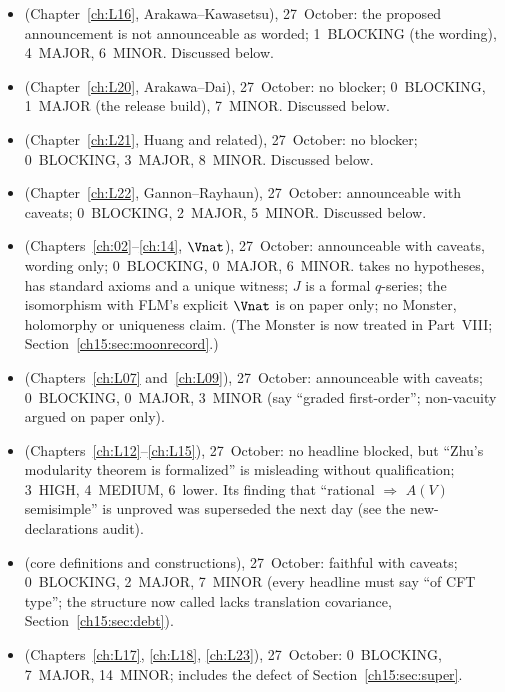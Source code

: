 \begin{itemize}
\item {} (Chapter~\ref{ch:L16}, Arakawa--Kawasetsu), 27~October: the proposed announcement is not
  announceable as worded; 1~BLOCKING (the wording), 4~MAJOR, 6~MINOR. Discussed below.
\item {} (Chapter~\ref{ch:L20}, Arakawa--Dai), 27~October: no blocker; 0~BLOCKING, 1~MAJOR (the
  release build), 7~MINOR. Discussed below.
\item {} (Chapter~\ref{ch:L21}, Huang and related), 27~October: no blocker; 0~BLOCKING, 3~MAJOR,
  8~MINOR. Discussed below.
\item {} (Chapter~\ref{ch:L22}, Gannon--Rayhaun), 27~October: announceable with caveats;
  0~BLOCKING, 2~MAJOR, 5~MINOR. Discussed below.
\item {} (Chapters~\ref{ch:02}--\ref{ch:14}, $\Vnat$), 27~October: announceable with caveats,
  wording only; 0~BLOCKING, 0~MAJOR, 6~MINOR.  takes no hypotheses, has standard axioms and a unique
  witness; $J$ is a formal $q$-series; the isomorphism with FLM's explicit $\Vnat$ is on paper only; no Monster,
  holomorphy or uniqueness claim. (The Monster is now treated in Part~VIII; Section~\ref{ch15:sec:moonrecord}.)
\item {} (Chapters~\ref{ch:L07} and~\ref{ch:L09}), 27~October: announceable with caveats;
  0~BLOCKING, 0~MAJOR, 3~MINOR (say ``graded first-order''; non-vacuity argued on paper only).
\item {} (Chapters~\ref{ch:L12}--\ref{ch:L15}), 27~October: no headline blocked, but ``Zhu's
  modularity theorem is formalized'' is misleading without qualification; 3~HIGH, 4~MEDIUM, 6~lower. Its finding that
  ``rational $\Rightarrow$ $A(V)$ semisimple'' is unproved was superseded the next day (see the new-declarations audit).
\item {} (core definitions and constructions), 27~October: faithful with caveats;
  0~BLOCKING, 2~MAJOR, 7~MINOR (every headline must say ``of CFT type''; the structure now called  lacks translation
  covariance, Section~\ref{ch15:sec:debt}).
\item {} (Chapters~\ref{ch:L17}, \ref{ch:L18}, \ref{ch:L23}), 27~October: 0~BLOCKING,
  7~MAJOR, 14~MINOR; includes the  defect of Section~\ref{ch15:sec:super}.

\end{itemize}
